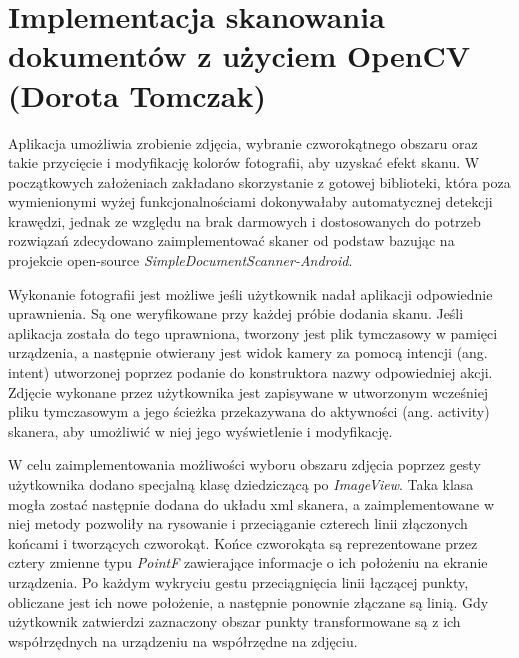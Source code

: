 \documentclass[10pt,twoside,a4paper]{report}
\begin{document}
\section{Implementacja skanowania dokumentów z użyciem OpenCV (Dorota Tomczak)}
\par Aplikacja umożliwia zrobienie zdjęcia, wybranie czworokątnego obszaru oraz takie przycięcie i modyfikację kolorów fotografii, aby uzyskać efekt skanu. W początkowych założeniach zakładano skorzystanie z gotowej biblioteki, która poza wymienionymi wyżej funkcjonalnościami dokonywałaby automatycznej detekcji krawędzi, jednak ze względu na brak darmowych i dostosowanych do potrzeb rozwiązań zdecydowano zaimplementować skaner od podstaw bazując na projekcie open-source \newline \textit{SimpleDocumentScanner-Android}\cite{SimpleDocumentScanner-Android}.

\par Wykonanie fotografii jest możliwe jeśli użytkownik nadał aplikacji odpowiednie uprawnienia. Są one weryfikowane przy każdej próbie dodania skanu. Jeśli aplikacja została do tego uprawniona, tworzony jest plik tymczasowy w pamięci urządzenia, a następnie otwierany jest widok kamery za pomocą intencji (ang. intent) utworzonej poprzez podanie do konstruktora nazwy odpowiedniej akcji. Zdjęcie wykonane przez użytkownika jest zapisywane w utworzonym wcześniej pliku tymczasowym a jego ścieżka przekazywana do aktywności (ang. activity) skanera, aby umożliwić w niej jego wyświetlenie i modyfikację.

\par W celu zaimplementowania możliwości wyboru obszaru zdjęcia poprzez gesty użytkownika dodano specjalną klasę dziedziczącą po \textit{ImageView}\cite{ImageView}. Taka klasa mogła zostać następnie dodana do układu xml skanera, a zaimplementowane w niej metody pozwoliły na rysowanie i przeciąganie czterech linii złączonych końcami i tworzących czworokąt. Końce czworokąta są reprezentowane przez cztery zmienne typu \textit{PointF} zawierające informacje o ich położeniu na ekranie urządzenia. Po każdym wykryciu gestu przeciągnięcia linii łączącej punkty, obliczane jest ich nowe położenie, a następnie ponownie złączane są linią. Gdy użytkownik zatwierdzi zaznaczony obszar punkty transformowane są z ich współrzędnych na urządzeniu na współrzędne na zdjęciu.
\end{document}
